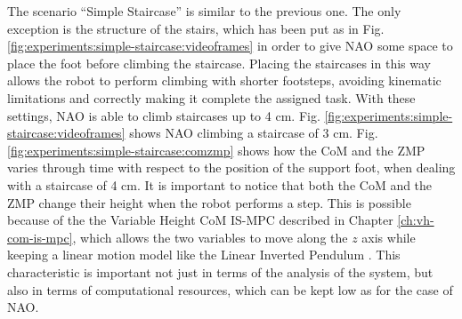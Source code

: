 The scenario ``Simple Staircase'' is similar to the previous one. The only 
exception is the structure of the stairs, which has been put as in Fig.
\ref{fig:experiments:simple-staircase:videoframes} in order to give NAO 
some space to place the foot before climbing the staircase. Placing the 
staircases in this way allows the robot to perform climbing with shorter 
footsteps, avoiding kinematic limitations and correctly making it complete 
the assigned task. With these settings, NAO is able to climb staircases
up to 4 cm.
Fig. \ref{fig:experiments:simple-staircase:videoframes} shows NAO climbing 
a staircase of 3 cm. Fig. \ref{fig:experiments:simple-staircase:comzmp} shows 
how the CoM and the ZMP varies through time with respect to the position of the 
support foot, when dealing with a staircase of 4 cm. It is important to notice 
that both the CoM and the ZMP change their height when the robot performs a
step. This 
is possible because of the the Variable Height CoM IS-MPC described in Chapter 
\ref{ch:vh-com-is-mpc}, which allows the two variables to move along the $z$ 
axis while keeping a linear motion model like the Linear Inverted Pendulum
\cite{DBLP:conf/humanoids/SciancaCSLO16}. This characteristic is important 
not just in terms of the analysis of the system, but also in terms of 
computational resources, which can be kept low as for the case of NAO.
